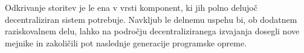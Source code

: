 \documentclass[a4paper, 12pt]{book}
\begin{document}
Odkrivanje storitev je le ena v vrsti komponent, ki jih polno delujoč decentraliziran sistem potrebuje.
Navkljub le delnemu uspehu bi, ob dodatnem raziskovalnem delu, lahko na področju decentraliziranega izvajanja dosegli nove mejnike in zakoličili pot naslednje generacije programske opreme.



\ \\
\clearpage
{}


\end{document}
